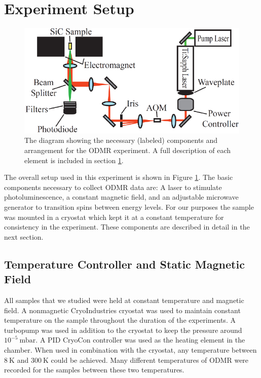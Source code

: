 \documentclass[oneside, noacknowlegments]{BYUPhys}
\begin{document}
\section{Experiment Setup}
\label{sec:Experiment}

\begin{figure}
    \centerline{\includegraphics{setup_fig}}
    \caption[Diagram of Experimental Setup for ODMR]{\label{fig:setup}
     The diagram showing the necessary (labeled) components and arrangement for the ODMR experiment. A full description of each element is included in section \ref{sec:Experiment}.}
 \end{figure}

The overall setup used in this experiment is shown in Figure \ref{fig:setup}. The basic components necessary to collect ODMR data are: A laser to stimulate photoluminescence, a constant magnetic field, and an adjustable microwave generator to transition spins between energy levels. For our purposes the sample was mounted in a cryostat which kept it at a constant temperature for consistency in the experiment. These components are described in detail in the next section.

\subsection{Temperature Controller and Static Magnetic Field}

All samples that we studied were held at constant temperature and magnetic field. A nonmagnetic CryoIndustries cryostat was used to maintain constant temperature on the sample throughout the duration of the experiments. A turbopump was used in addition to the cryostat to keep the pressure around $10^{-5}~\text{mbar}$. A PID CryoCon controller was used as the heating element in the chamber. When used in combination with the cryostat, any temperature between $8~\text{K}$ and $300~\text{K}$ could be achieved. Many different temperatures of ODMR were recorded for the samples between these two temperatures.
\end{document}

